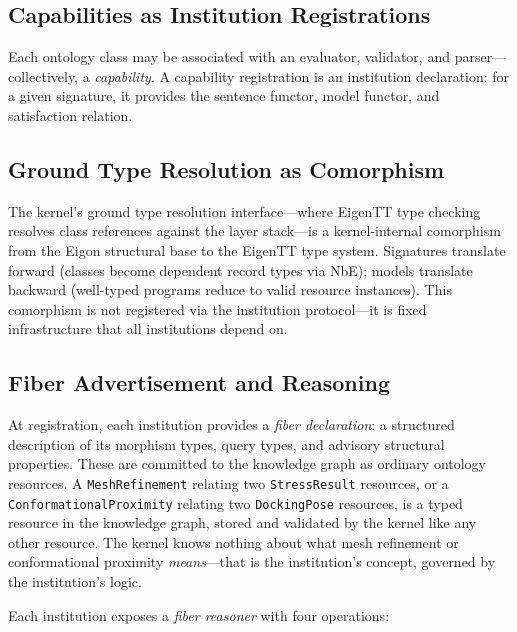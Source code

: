 \documentclass[10pt,twocolumn,letterpaper]{article}
\newcommand{\code}[1]{\texttt{\small #1}}
\begin{document}
\subsection{Capabilities as Institution Registrations}

Each ontology class may be associated with an evaluator, validator, and parser---collectively, a \emph{capability}.
A capability registration is an institution declaration: for a given signature, it provides the sentence functor, model functor, and satisfaction relation.

\subsection{Ground Type Resolution as Comorphism}

The kernel's ground type resolution interface---where EigenTT type checking resolves class references against the layer stack---is a kernel-internal comorphism from the Eigon structural base to the EigenTT type system.
Signatures translate forward (classes become dependent record types via NbE); models translate backward (well-typed programs reduce to valid resource instances).
This comorphism is not registered via the institution protocol---it is fixed infrastructure that all institutions depend on.

\subsection{Fiber Advertisement and Reasoning}

At registration, each institution provides a \emph{fiber declaration}: a structured description of its morphism types, query types, and advisory structural properties.
These are committed to the knowledge graph as ordinary ontology resources.
A \code{MeshRefinement} relating two \code{StressResult} resources, or a \code{ConformationalProximity} relating two \code{DockingPose} resources, is a typed resource in the knowledge graph, stored and validated by the kernel like any other resource.
The kernel knows nothing about what mesh refinement or conformational proximity \emph{means}---that is the institution's concept, governed by the institution's logic.

Each institution exposes a \emph{fiber reasoner} with four operations:
\end{document}
